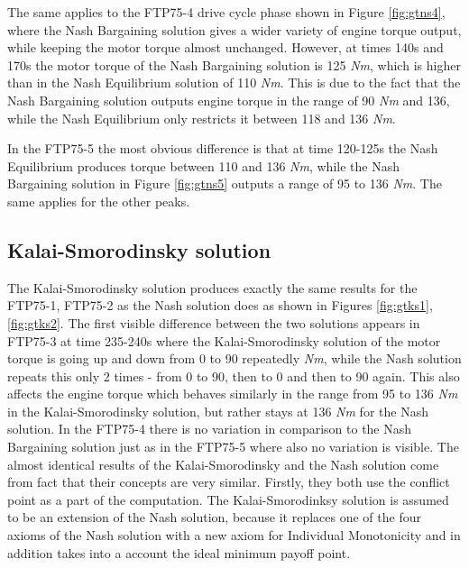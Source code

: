 The same applies to the FTP75-4 drive cycle phase shown in Figure \ref{fig:gtns4}, where the Nash Bargaining solution gives a wider variety of engine torque output, while keeping the motor torque almost unchanged. However, at times 140s and 170s the motor torque of the Nash Bargaining solution is 125 \textit{Nm}, which is higher than in the Nash Equilibrium solution of 110 \textit{Nm}. This is due to the fact that the Nash Bargaining solution outputs engine torque in the range of 90 \textit{Nm} and 136, while the Nash Equilibrium only restricts it between 118 and 136 \textit{Nm}.

In the FTP75-5 the most obvious difference is that at time 120-125s the Nash Equilibrium produces torque between 110 and 136 \textit{Nm}, while the Nash Bargaining solution in Figure \ref{fig:gtns5} outputs a range of 95 to 136 \textit{Nm}. The same applies for the other peaks.

\subsection{Kalai-Smorodinsky solution}
The Kalai-Smorodinsky solution produces exactly the same results for the FTP75-1, FTP75-2 as the Nash solution does as shown in Figures \ref{fig:gtks1}, \ref{fig:gtks2}. The first visible difference between the two solutions appears in FTP75-3 at time 235-240s where the Kalai-Smorodinsky solution of the motor torque is going up and down from 0 to 90 repeatedly \textit{Nm}, while the Nash solution repeats this only 2 times - from 0 to 90, then to 0 and then to 90 again. This also affects the engine torque which behaves similarly in the range from 95 to 136 \textit{Nm} in the Kalai-Smorodinsky solution, but rather stays at 136 \textit{Nm} for the Nash solution. In the FTP75-4 there is no variation in comparison to the Nash Bargaining solution just as in the FTP75-5 where also no variation is visible. The almost identical results of the Kalai-Smorodinsky and the Nash solution come from fact that their concepts are very similar. Firstly, they both use the conflict point as a part of the computation. The Kalai-Smorodinksy solution is assumed to be an extension of the Nash solution, because it replaces one of the four axioms of the Nash solution with a new axiom for Individual Monotonicity and in addition takes into a account the ideal minimum payoff point.


